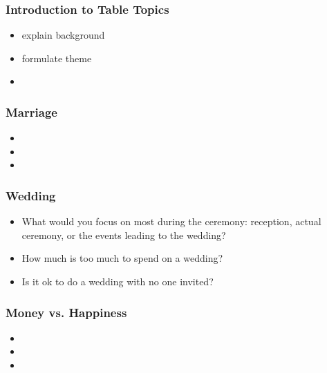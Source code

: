 

\begin{frame}
\frametitle{Introduction to Table Topics }
\begin{itemize} 
\item explain background 
\item formulate theme
\item 
\end{itemize} 
\end{frame} 

\begin{frame}
\frametitle{Marriage} 
\begin{itemize} 
\item 
\item 
\item 
\end{itemize} 
\end{frame} 

\begin{frame}
\frametitle{Wedding}
\begin{itemize}
\item What would you focus on most during the ceremony: reception, actual ceremony, or the events leading to the wedding? 
\item How much is too much to spend on a wedding? 
\item Is it ok to do a wedding with no one invited? 
\end{itemize}
\end{frame}

\begin{frame}
\frametitle{Money vs. Happiness}
\begin{itemize}
\item 
\item 
\item 
\end{itemize}
\end{frame} 


